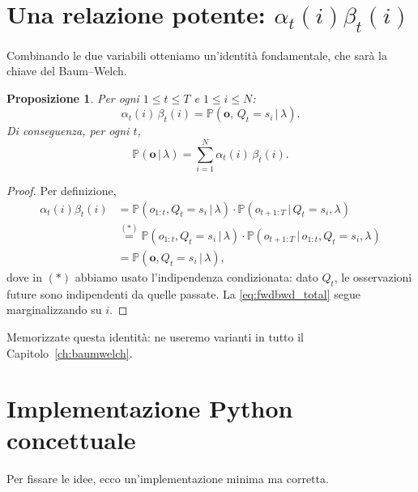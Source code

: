 \documentclass[11pt,a4paper,oneside]{book}
\theoremstyle{plain}
\newtheorem{proposizione}[teorema]{Proposizione}
\theoremstyle{definition}
\theoremstyle{remark}
\newcommand{\Prob}{\mathbb{P}}
\newcommand{\hmm}{\lambda}                   %
\newcommand{\Nstates}{N}                     %
\newcommand{\Tlen}{T}                        %
\newcommand{\seqobs}{\mathbf{o}}             %
\newcommand{\fwd}{\alpha}                    %
\newcommand{\bwd}{\beta}                     %
\newcommand{\given}{\,\vert\,}
\begin{document}
\section{Una relazione potente: \texorpdfstring{$\fwd_t(i)\bwd_t(i)$}{forward x backward}}

Combinando le due variabili otteniamo un'identità fondamentale, che
sarà la chiave del Baum--Welch.

\begin{proposizione}\label{prop:fwdbwd}
Per ogni $1\le t\le \Tlen$ e $1\le i\le \Nstates$:
\begin{equation}
    \fwd_t(i)\,\bwd_t(i)
    = \Prob(\seqobs,\,Q_t=s_i\given\hmm).
\end{equation}
Di conseguenza, per ogni $t$,
\begin{equation}
    \Prob(\seqobs\given\hmm) = \sum_{i=1}^{\Nstates}\fwd_t(i)\,\bwd_t(i).
    \label{eq:fwdbwd_total}
\end{equation}
\end{proposizione}

\begin{proof}
Per definizione,
\begin{align*}
\fwd_t(i)\bwd_t(i)
&= \Prob(o_{1:t},Q_t=s_i\given\hmm)\cdot\Prob(o_{t+1:\Tlen}\given Q_t=s_i,\hmm)\\
&\stackrel{(*)}{=} \Prob(o_{1:t},Q_t=s_i\given\hmm)\cdot
                   \Prob(o_{t+1:\Tlen}\given o_{1:t},Q_t=s_i,\hmm)\\
&= \Prob(\seqobs,Q_t=s_i\given\hmm),
\end{align*}
dove in $(*)$ abbiamo usato l'indipendenza condizionata: dato $Q_t$,
le osservazioni future sono indipendenti da quelle passate. La
\eqref{eq:fwdbwd_total} segue marginalizzando su $i$.
\end{proof}

Memorizzate questa identità: ne useremo varianti in tutto il
Capitolo~\ref{ch:baumwelch}.

\section{Implementazione Python concettuale}

Per fissare le idee, ecco un'implementazione minima ma corretta.
\end{document}
